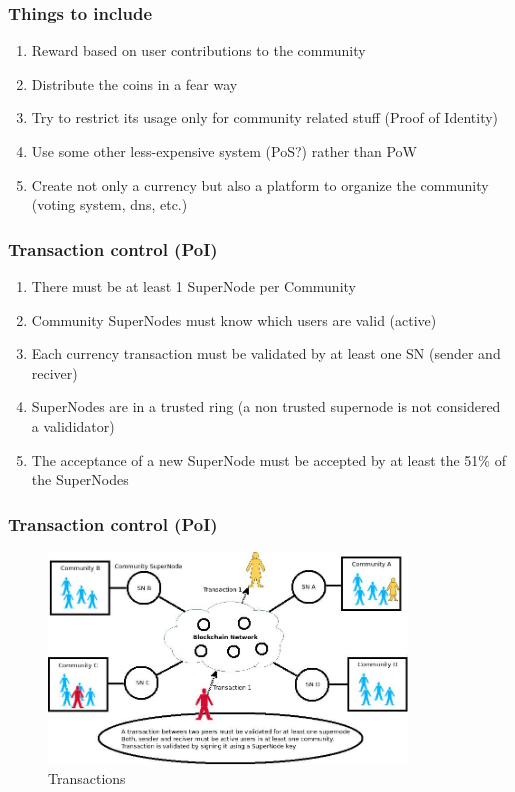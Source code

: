 \documentclass[usepdftitle=false,13pt]{beamer}
\begin{document}
\begin{frame}\frametitle{Things to include}
\begin{enumerate}
		\item Reward based on user contributions to the community
		\item Distribute the coins in a fear way
		\item Try to restrict its usage only for community related stuff (Proof of Identity)
		\item Use some other less-expensive system (PoS?) rather than PoW
		\item Create not only a currency but also a platform to organize the community (voting system, dns, etc.)
\end{enumerate}
\end{frame}


\begin{frame}\frametitle{Transaction control (PoI)}
\begin{enumerate}
		\item There must be at least 1 SuperNode per Community
		\item Community SuperNodes must know which users are valid (active)
		\item Each currency transaction must be validated by at least one SN (sender and reciver)
		\item SuperNodes are in a trusted ring (a non trusted supernode is not considered a valididator)
		\item The acceptance of a new SuperNode must be accepted by at least the 51\% of the SuperNodes
\end{enumerate}
\end{frame}


\begin{frame}\frametitle{Transaction control (PoI)}
\begin{figure}[h!]
\begin{center}
\includegraphics[width=0.85\textwidth]{pic/transactions}
\caption{Transactions}
\label{fig:block}
\end{center}
\end{figure}
\end{frame}
\end{document}
